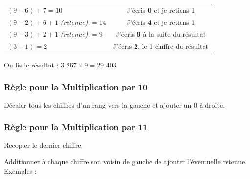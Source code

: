 \documentclass[a4paper]{article}
\begin{document}
\begin{small}
\begin{enumerate}
\begin{tabular}{l|c}
		$(9 - 6) + 7 = 10$ & J'écris \textbf{0} et je retiens 1
		
		\tabularnewline
		
		$(9 - 2) + 6 + 1$ \textit{(retenue)} $= 14$ & J'écris \textbf{4} et je retiens 1
		
		\tabularnewline
		
		$(9 - 3) + 2 + 1$ \textit{(retenue)} $= 9$ & J'écris \textbf{9} à la suite du résultat
		
		\tabularnewline
		
		$(3 - 1) = 2$ & J'écris \textbf{2}, le 1\up{er} chiffre du résultat
		
	\end{tabular}
	
	On lis le résultat : {\boldmath $3$ $267 \times 9 = 29$ $403$}\\	
	
\end{enumerate}
\end{small}


\vfill
{\noindent \dotfill}


\subsubsection*{Règle pour la Multiplication par 10}

Décaler tous les chiffres d'un rang vers la gauche et ajouter un 0 à droite.\\


\vfill
{\noindent \dotfill}


\subsubsection*{Règle pour la Multiplication par 11}

Recopier le dernier chiffre.

Additionner à chaque chiffre son voisin de gauche de ajouter l'éventuelle retenue.\\

{ \parindent=0.5cm Exemples : }
\end{document}
